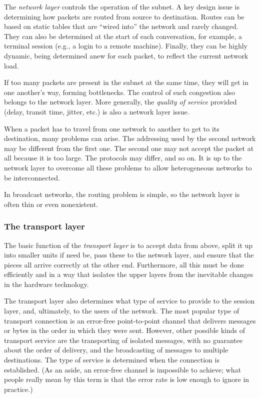 \documentclass[b5paper,11pt]{memoir}
\begin{document}
The \emph{network layer} controls the operation of the subnet.
A key design issue is determining how packets are routed from source to destination.
Routes can be based on static tables that are ``wired into'' the network and rarely changed.
They can also be determined at the start of each conversation, for example, a terminal session (e.g., a login to a remote
machine). Finally, they can be highly dynamic, being determined anew for
each packet, to reflect the current network load.

If too many packets are present in the subnet at the same time, they
will get in one another's way, forming bottlenecks. The control of such
congestion also belongs to the network layer. More generally, the
\emph{quality of service} provided (delay, transit time, jitter, etc.) is also a network layer issue.

When a packet has to travel from one network to another to get to its
destination, many problems can arise. The addressing used by the second
network may be different from the first one. The second one may not
accept the packet at all because it is too large. The protocols may
differ, and so on. It is up to the network layer to overcome all these
problems to allow heterogeneous networks to be interconnected.

In broadcast networks, the routing problem is simple, so the network
layer is often thin or even nonexistent.



\subsubsection{The transport layer}

The basic function of the \emph{transport layer} is to accept data from
above, split it up into smaller units if need be, pass these to the
network layer, and ensure that the pieces all arrive correctly at the
other end. Furthermore, all this must be done efficiently and in a way
that isolates the upper layers from the inevitable changes in the
hardware technology.

The transport layer also determines what type of service to provide to
the session layer, and, ultimately, to the users of the network. The
most popular type of transport connection is an error-free
point-to-point channel that delivers messages or bytes in the order in
which they were sent. However, other possible kinds of transport service
are the transporting of isolated messages, with no guarantee about the
order of delivery, and the broadcasting of messages to multiple
destinations. The type of service is determined when the connection is
established. (As an aside, an error-free channel is impossible to
achieve; what people really mean by this term is that the error rate is
low enough to ignore in practice.)
\end{document}

